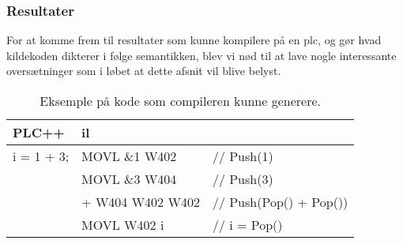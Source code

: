 \subsubsection{Resultater}
For at komme frem til resultater som kunne kompilere på en \gls{plc}, og gør hvad kildekoden dikterer i følge semantikken, blev vi nød til at lave nogle interessante oversætninger som i løbet at dette afsnit vil blive belyst.

\begin{table}[h]
    \centering\ttfamily
    \begin{tabular}{l|l l}
        PLC++       & \gls{il} \\\hline
        i = 1 + 3;  & MOVL \&1 W402     &// Push(1)\\
                    & MOVL \&3 W404     &// Push(3)\\
                    & + W404 W402 W402  &// Push(Pop() + Pop())\\
                    & MOVL W402 i       &// i = Pop()
    \end{tabular}
    \caption{Eksemple på kode som compileren kunne generere.}
    \label{tab:codegenExample}
\end{table}

